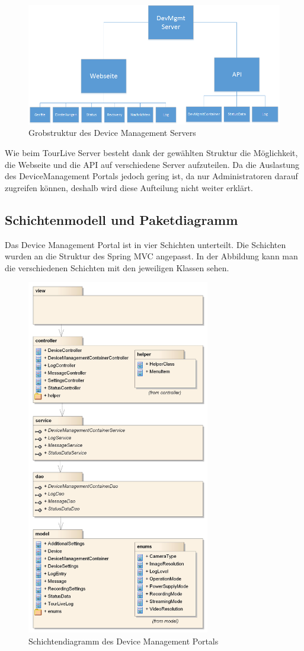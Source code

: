 \begin{figure}[H]
	\centering
	\includegraphics[width=120mm]{images/devmgmtsrv/uebersicht.png}
	\caption{Grobstruktur des Device Management Servers}
\end{figure}

Wie beim TourLive Server besteht dank der gewählten Struktur die Möglichkeit, die Webseite und die API auf verschiedene Server aufzuteilen. Da die Auslastung des DeviceManagement Portals jedoch gering ist, da nur Administratoren darauf zugreifen können, deshalb wird diese Aufteilung nicht weiter erklärt.

\subsection{Schichtenmodell und Paketdiagramm}
Das Device Management Portal ist in vier Schichten unterteilt. Die Schichten wurden an die Struktur des Spring MVC angepasst. In der Abbildung kann man die verschiedenen Schichten mit den jeweiligen Klassen sehen.

\begin{figure}[H]
	\centering
	\includegraphics[width=80mm]{images/devmgmtsrv/schichten.jpg}
	\caption{Schichtendiagramm des Device Management Portals}
\end{figure}


